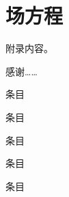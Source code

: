 \documentclass[professional,ncu,newenv]{ncuthesis}
\begin{document}
\section{场方程}
附录内容。
\backmatter

\begin{acknowledgements}
感谢……
\end{acknowledgements}
\begin{researchresults}
\begin{published}
\item 条目
\end{published}
\begin{tobepublished}
\item 条目
\end{tobepublished}
\begin{reports}
\item 条目
\end{reports}
\begin{others}[另外还有]
\item 条目
\end{others}
\begin{papers}
\item 条目
\end{papers}
\end{researchresults}
\end{document}
